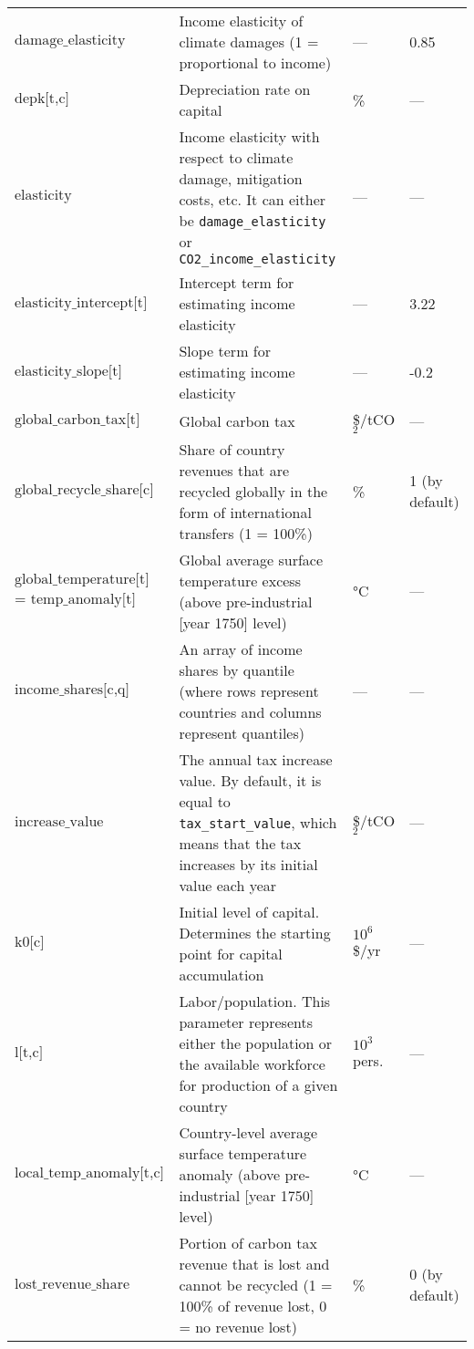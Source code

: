 \documentclass[
]{article}
\begin{document}
\begin{longtable}{|p{1.5in}|p{2.5in}|p{0.9in}|p{0.7in}|}
  \(\text{damage\_elasticity}\) & Income elasticity of climate damages (1 = proportional to income) & — & 0.85 \\
  \(\text{depk[t,c]}\) & Depreciation rate on capital & \% & — \\
  \(\text{elasticity}\) & Income elasticity with respect to climate damage, mitigation costs, etc. It can either be \texttt{damage\_elasticity} or \texttt{CO2\_income\_elasticity} & — & — \\
  \(\text{elasticity\_intercept[t]}\) & Intercept term for estimating income elasticity & — & 3.22\footnotemark[1] \\
  \(\text{elasticity\_slope[t]}\) & Slope term for estimating income elasticity & — & -0.2\footnotemark[1]\\
  \(\text{global\_carbon\_tax[t]}\) & Global carbon tax & \$/tCO$_2$ & — \\
  \(\text{global\_recycle\_share[c]}\) & Share of country revenues that are recycled globally in the form of international transfers (1 = 100\%) & \% & 1 (by default) \\
  \(\text{global\_temperature[t]}\) = \(\text{temp\_anomaly[t]}\) & Global average surface temperature excess (above pre-industrial {[}year 1750{]} level) & °C & — \\
  \(\text{income\_shares[c,q]}\) & An array of income shares by quantile (where rows represent countries and columns represent quantiles) & — & — \\
  \(\text{increase\_value}\) & The annual tax increase value. By default, it is equal to \texttt{tax\_start\_value}, which means that the tax increases by its initial value each year & \$/tCO$_2$ & — \\
  \(\text{k0[c]}\) & Initial level of capital. Determines the starting point for capital accumulation & $10^6$ \$/yr & — \\
  \(\text{l[t,c]}\) & Labor/population. This parameter represents either the population or the available workforce for production of a given country & $10^3$ pers. & — \\

  \(\text{local\_temp\_anomaly[t,c]}\) & Country-level average surface temperature anomaly (above pre-industrial {[}year 1750{]} level) & °C & — \\
  \(\text{lost\_revenue\_share}\) & Portion of carbon tax revenue that is lost and cannot be recycled (1 = 100\% of revenue lost, 0 = no revenue lost) & \% & 0 (by default) \\


\end{longtable}
\end{document}
